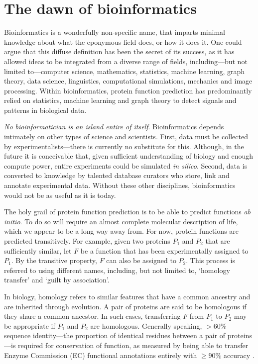 \section{The dawn of bioinformatics}

Bioinformatics is a wonderfully non-specific name, that imparts minimal knowledge about what the eponymous field does, or how it does it. One could argue that this diffuse definition has been the secret of its success, as it has allowed ideas to be integrated from a diverse range of fields, including---but not limited to---computer science, mathematics, statistics, machine learning, graph theory, data science, linguistics, computational simulations, mechanics and image processing. Within bioinformatics, protein function prediction has predominantly relied on statistics, machine learning and graph theory to detect signals and patterns in biological data.

\emph{No bioinformatician is an island entire of itself}. Bioinformatics depends intimately on other types of science and scientists. First, data must be collected by experimentalists---there is currently no substitute for this. Although, in the future it is conceivable that, given sufficient understanding of biology and enough compute power, entire experiments could be simulated \emph{in silico}. Second, data is converted to knowledge by talented database curators who store, link and annotate experimental data. Without these other disciplines, bioinformatics would not be as useful as it is today.

The holy grail of protein function prediction is to be able to predict functions \emph{ab initio}. To do so will require an almost complete molecular description of life, which we appear to be a long way away from. For now, protein functions are predicted transitively. For example, given two proteins $P_1$ and $P_2$ that are sufficiently similar, let $F$ be a function that has been experimentally assigned to $P_1$. By the transitive property, $F$ can also be assigned to $P_2$. This process is referred to using different names, including, but not limited to, `homology transfer' and `guilt by association'.

In biology, homology refers to similar features that have a common ancestry and are inherited through evolution. A pair of proteins are said to be homologous if they share a common ancestor. In such cases, transferring $F$ from $P_1$ to $P_2$ may be appropriate if $P_1$ and $P_2$ are homologous. Generally speaking, $> 60\%$ sequence identity---the proportion of identical residues between a pair of proteins---is required for conservation of function, as measured by being able to transfer Enzyme Commission (EC) functional annotations entirely with $\ge 90\%$ accuracy \cite{Tian2003,Rost2002}.

